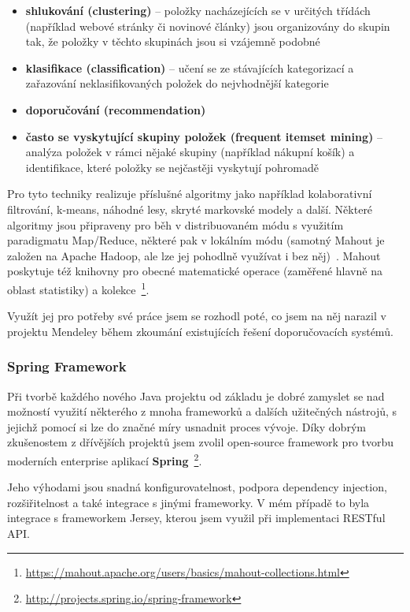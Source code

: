 \documentclass[thesis=M,czech]{FITthesis}[2014/05/07]
\begin{document}
\begin{itemize}
	\item \textbf{shlukování (clustering)} – položky nacházejících se v určitých třídách (například webové stránky či novinové články) jsou organizovány do skupin tak, že položky v těchto skupinách jsou si vzájemně podobné
	\item \textbf{klasifikace (classification)} – učení se ze stávajících kategorizací a zařazování neklasifikovaných položek do nejvhodnější kategorie
	\item \textbf{doporučování (recommendation)}
	\item \textbf{často se vyskytující skupiny položek (frequent itemset mining)} – analýza položek v rámci nějaké skupiny (například nákupní košík) a identifikace, které položky se nejčastěji vyskytují pohromadě
\end{itemize}

Pro tyto techniky realizuje příslušné algoritmy jako například kolaborativní filtrování, k-means, náhodné lesy, skryté markovské modely a další. Některé algoritmy jsou připraveny pro běh v distribuovaném módu s využitím paradigmatu Map/Reduce, některé pak v lokálním módu (samotný Mahout je založen na Apache Hadoop, ale lze jej pohodlně využívat i bez něj)~\cite{mahouttut}. Mahout poskytuje též knihovny pro obecné matematické operace (zaměřené hlavně na oblast statistiky) a kolekce~\footnote{\url{https://mahout.apache.org/users/basics/mahout-collections.html}}. 

Využít jej pro potřeby své práce jsem se rozhodl poté, co jsem na něj narazil v projektu Mendeley během zkoumání existujících řešení doporučovacích systémů. 

\subsubsection{Spring Framework}
Při tvorbě každého nového Java projektu od základu je dobré zamyslet se nad možností využití některého z mnoha frameworků a dalších užitečných nástrojů, s jejichž pomocí si lze do značné míry usnadnit proces vývoje. Díky dobrým zkušenostem z dřívějších projektů jsem zvolil open-source framework pro tvorbu moderních enterprise aplikací \textbf{Spring}~\footnote{\url{http://projects.spring.io/spring-framework}}. 

Jeho výhodami jsou snadná konfigurovatelnost, podpora dependency injection, rozšiřitelnost a také integrace s jinými frameworky. V mém případě to byla integrace s frameworkem Jersey, kterou jsem využil při implementaci RESTful API.
\end{document}
